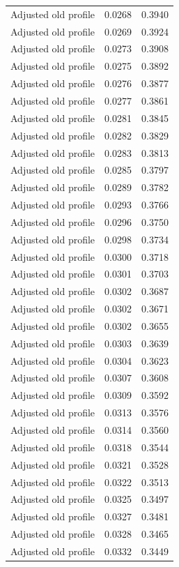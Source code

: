 \begin{table}[htbp]
\begin{tabular}{lll}
Adjusted old profile & 0.0268 & 0.3940 \\
Adjusted old profile & 0.0269 & 0.3924 \\
Adjusted old profile & 0.0273 & 0.3908 \\
Adjusted old profile & 0.0275 & 0.3892 \\
Adjusted old profile & 0.0276 & 0.3877 \\
Adjusted old profile & 0.0277 & 0.3861 \\
Adjusted old profile & 0.0281 & 0.3845 \\
Adjusted old profile & 0.0282 & 0.3829 \\
Adjusted old profile & 0.0283 & 0.3813 \\
Adjusted old profile & 0.0285 & 0.3797 \\
Adjusted old profile & 0.0289 & 0.3782 \\
Adjusted old profile & 0.0293 & 0.3766 \\
Adjusted old profile & 0.0296 & 0.3750 \\
Adjusted old profile & 0.0298 & 0.3734 \\
Adjusted old profile & 0.0300 & 0.3718 \\
Adjusted old profile & 0.0301 & 0.3703 \\
Adjusted old profile & 0.0302 & 0.3687 \\
Adjusted old profile & 0.0302 & 0.3671 \\
Adjusted old profile & 0.0302 & 0.3655 \\
Adjusted old profile & 0.0303 & 0.3639 \\
Adjusted old profile & 0.0304 & 0.3623 \\
Adjusted old profile & 0.0307 & 0.3608 \\
Adjusted old profile & 0.0309 & 0.3592 \\
Adjusted old profile & 0.0313 & 0.3576 \\
Adjusted old profile & 0.0314 & 0.3560 \\
Adjusted old profile & 0.0318 & 0.3544 \\
Adjusted old profile & 0.0321 & 0.3528 \\
Adjusted old profile & 0.0322 & 0.3513 \\
Adjusted old profile & 0.0325 & 0.3497 \\
Adjusted old profile & 0.0327 & 0.3481 \\
Adjusted old profile & 0.0328 & 0.3465 \\
Adjusted old profile & 0.0332 & 0.3449 \\

\end{tabular}
\end{table}
